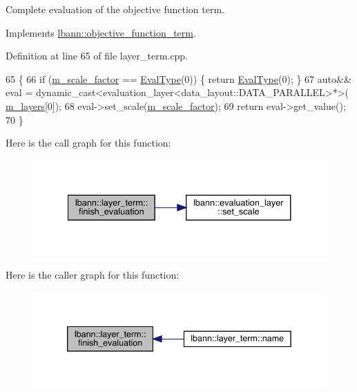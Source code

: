 Complete evaluation of the objective function term. 

Implements \hyperlink{classlbann_1_1objective__function__term_a7a82f2cdbc954655ac860896306aed0c}{lbann\+::objective\+\_\+function\+\_\+term}.



Definition at line 65 of file layer\+\_\+term.\+cpp.


\begin{DoxyCode}
65                                        \{
66   \textcolor{keywordflow}{if} (\hyperlink{classlbann_1_1objective__function__term_a59a544b8ff0455ed5091de3bf0d81c3c}{m\_scale\_factor} == \hyperlink{base_8hpp_a3266f5ac18504bbadea983c109566867}{EvalType}(0)) \{ \textcolor{keywordflow}{return} \hyperlink{base_8hpp_a3266f5ac18504bbadea983c109566867}{EvalType}(0); \}
67   \textcolor{keyword}{auto}&& eval = \textcolor{keyword}{dynamic\_cast<}evaluation\_layer<data\_layout::DATA\_PARALLEL>*\textcolor{keyword}{>}(
      \hyperlink{classlbann_1_1objective__function__term_a9269cf0a237eacd1e220ba2739f44334}{m\_layers}[0]);
68   eval->set\_scale(\hyperlink{classlbann_1_1objective__function__term_a59a544b8ff0455ed5091de3bf0d81c3c}{m\_scale\_factor});
69   \textcolor{keywordflow}{return} eval->get\_value();
70 \}
\end{DoxyCode}
Here is the call graph for this function\+:\nopagebreak
\begin{figure}[H]
\begin{center}
\leavevmode
\includegraphics[width=334pt]{classlbann_1_1layer__term_a2b0fdcf6a0dd7bea797b5ef1b4082f70_cgraph}
\end{center}
\end{figure}
Here is the caller graph for this function\+:\nopagebreak
\begin{figure}[H]
\begin{center}
\leavevmode
\includegraphics[width=339pt]{classlbann_1_1layer__term_a2b0fdcf6a0dd7bea797b5ef1b4082f70_icgraph}
\end{center}
\end{figure}
\mbox{\label{classlbann_1_1layer__term_a4942422215408e724e68b5df8b20b715}} 
